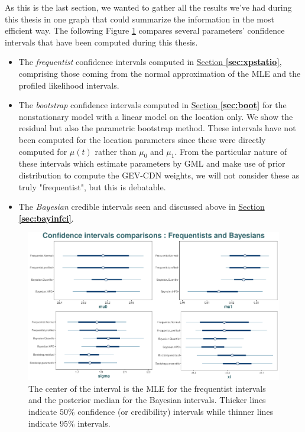 As this is the last section, we wanted to gather all the results we've had during this thesis in one graph that could summarize the information in the most efficient way.
The following Figure \ref{fig:cicomp} compares several parameters' confidence intervals that have been computed during this thesis. 

\begin{itemize}
	\item The \emph{frequentist} confidence intervals computed in
	\hyperref[sec:xpstatio]{Section \textbf{\ref{sec:xpstatio}}}, comprising those coming from the normal approximation of the MLE and the profiled likelihood intervals.
	\item The \emph{bootstrap} confidence intervals computed in  \hyperref[sec:boot]{Section \textbf{\ref{sec:boot}}} for the nonstationary model with  a linear model on the location only. We show the residual but also the parametric bootstrap method. These intervals have not been computed for the location parameters since these were directly computed for $\mu(t)$ rather than $\mu_0$ and $\mu_1$. From the particular nature of these intervals which estimate parameters by GML and make use of prior distribution to compute the GEV-CDN weights, we will not consider these as truly "frequentist", but this is debatable.
	\item The \emph{Bayesian} credible intervals seen and discussed above in \hyperref[sec:bayinfci]{Section \textbf{\ref{sec:bayinfci}}}.
\end{itemize}

\begin{figure}[!htb]
	\centering	\includegraphics[width=0.9\linewidth]{cicomp.pdf}\caption{The center of the interval is the MLE for the frequentist intervals and the posterior median for the Bayesian intervals. Thicker lines indicate $50\%$ confidence (or credibility) intervals while thinner lines indicate $95\%$ intervals.}\label{fig:cicomp}
\end{figure}

